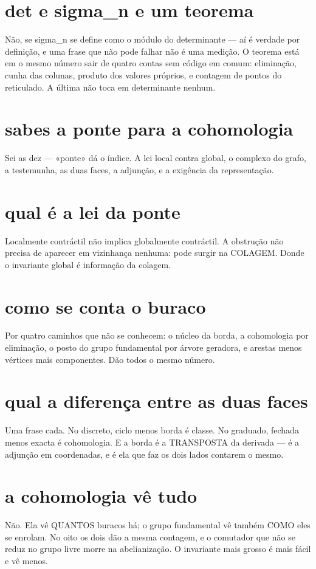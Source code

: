 \documentclass[11pt,a4paper]{article}
\begin{document}
\section{det e sigma_n e um teorema}
Não, se sigma_n se define como o módulo do determinante — aí é verdade por definição, e
uma frase que não pode falhar não é uma medição. O teorema está em o mesmo número sair de
quatro contas sem código em comum: eliminação, cunha das colunas, produto dos valores
próprios, e contagem de pontos do reticulado. A última não toca em determinante nenhum.

\section{sabes a ponte para a cohomologia}
Sei as dez — «ponte» dá o índice. A lei local contra global, o complexo do grafo, a
testemunha, as duas faces, a adjunção, e a exigência da representação.

\section{qual é a lei da ponte}
Localmente contráctil não implica globalmente contráctil. A obstrução não precisa de
aparecer em vizinhança nenhuma: pode surgir na COLAGEM. Donde o invariante global é
informação da colagem.

\section{como se conta o buraco}
Por quatro caminhos que não se conhecem: o núcleo da borda, a cohomologia por eliminação,
o posto do grupo fundamental por árvore geradora, e arestas menos vértices mais
componentes. Dão todos o mesmo número.

\section{qual a diferença entre as duas faces}
Uma frase cada. No discreto, ciclo menos borda é classe. No graduado, fechada menos
exacta é cohomologia. E a borda é a TRANSPOSTA da derivada — é a adjunção em coordenadas,
e é ela que faz os dois lados contarem o mesmo.

\section{a cohomologia vê tudo}
Não. Ela vê QUANTOS buracos há; o grupo fundamental vê também COMO eles se enrolam. No
oito os dois dão a mesma contagem, e o comutador que não se reduz no grupo livre morre na
abelianização. O invariante mais grosso é mais fácil e vê menos.
\end{document}
